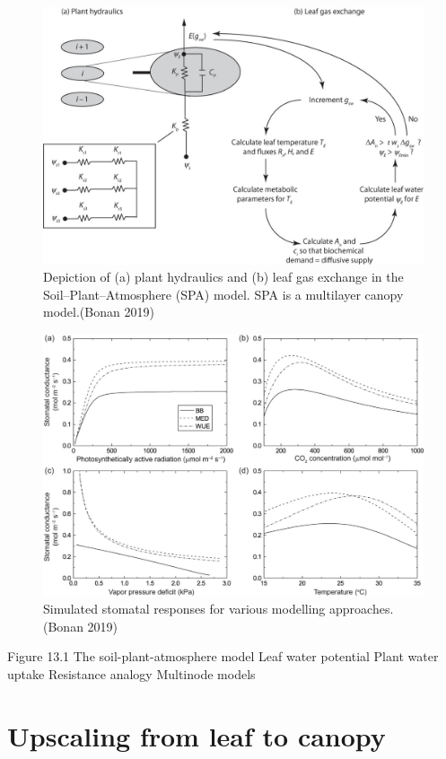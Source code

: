 \documentclass[12pt,oneside]{book}
\begin{document}
\begin{figure}

{\centering \includegraphics[width=0.8\linewidth]{figures/chap2/SPA} 

}

\caption{Depiction of (a) plant hydraulics and (b) leaf gas exchange in the Soil–Plant–Atmosphere (SPA) model. SPA is a multilayer canopy model.(Bonan 2019)}\label{fig:f219}
\end{figure}

\begin{figure}

{\centering \includegraphics[width=0.8\linewidth]{figures/chap2/modelling_approaches} 

}

\caption{Simulated stomatal responses for various modelling approaches. (Bonan 2019)}\label{fig:f220}
\end{figure}

Figure 13.1 The soil-plant-atmosphere model Leaf water potential Plant
water uptake Resistance analogy Multinode models

\section{Upscaling from leaf to
canopy}\label{upscaling-from-leaf-to-canopy}
\end{document}
